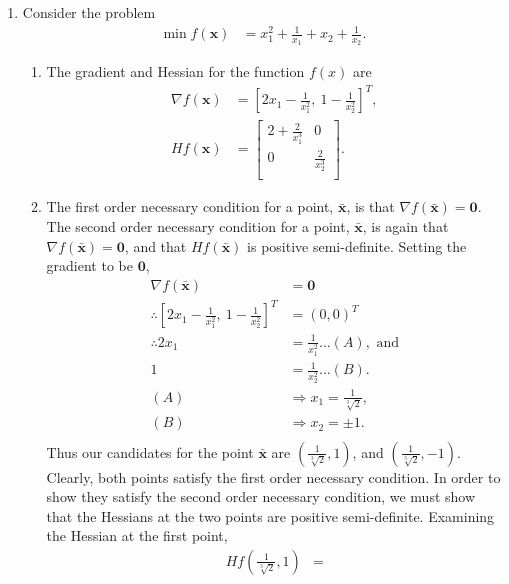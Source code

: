 \documentclass[a4paper,11pt]{article}
\newcommand{\ds}{\displaystyle}
\begin{document}
{{\begin{enumerate}[leftmargin=*]
		\item Consider the problem
			\begin{align*}
				\min f(\mathbf{x}) & = x_1^2 + \frac{1}{x_1} + x_2 + \frac{1}{x_2}. 
			\end{align*}
			\begin{enumerate}[label=\alph*)]
				\item The gradient and Hessian for the function $\ds{f(x)}$ are
					\begin{align*}
						\nabla f(\mathbf{x}) & = \left[2x_1 - \frac{1}{x_1^2},\: 1-\frac{1}{x_2^2}\right]^T, \\
						Hf(\mathbf{x}) & = 
						\begin{bmatrix}
							2 + \frac{2}{x_1^3} & 0 \\
							0 & \frac{2}{x_2^3} \\
						\end{bmatrix}.
					\end{align*}
				\item The first order necessary condition for a point, $\ds{\bar{\mathbf{x}}}$, is that $\ds{\nabla f(\bar{\mathbf{x}}) = \mathbf{0}}$. The second order necessary condition for a point, $\ds{\bar{\mathbf{x}}}$, is again that $\ds{\nabla f(\bar{\mathbf{x}}) = \mathbf{0}}$, and that $\ds{Hf(\bar{\mathbf{x}})}$ is positive semi-definite. Setting the gradient to be $\ds{\mathbf{0}}$, 
					\begin{align*}
						\nabla f(\bar{\mathbf{x}}) & = \mathbf{0}\\
						\therefore \left[2x_1 - \frac{1}{x_1^2},\: 1-\frac{1}{x_2^2}\right]^T & = (0, 0)^T \\
						\therefore 2x_1 & = \frac{1}{x_1^2} \dots (A), \text{ and} \\
						1 & = \frac{1}{x_2^2} \dots (B).\\
						(A) & \Rightarrow x_1 = \frac{1}{\sqrt[3]{2}}, \\
						(B) & \Rightarrow x_2 = \pm 1. \\
					\end{align*}
					Thus our candidates for the point $\ds{\bar{\mathbf{x}}}$ are $\ds{\left(\frac{1}{\sqrt[3]{2}}, 1\right)}$, and $\ds{\left(\frac{1}{\sqrt[3]{2}}, -1\right)}$. Clearly, both points satisfy the first order necessary condition. In order to show they satisfy the second order necessary condition, we must show that the Hessians at the two points are positive semi-definite. Examining the Hessian at the first point, 
					\begin{align*}
						Hf\left(\frac{1}{\sqrt[3]{2}}, 1\right) & = 

\end{align*}
\end{enumerate}
\end{enumerate}}}
\end{document}
